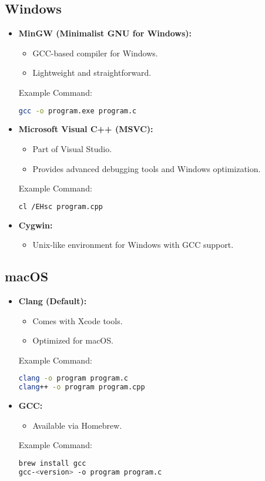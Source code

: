 \documentclass[a4paper,12pt]{article}
\begin{document}
\subsection{Windows}
\begin{itemize}
\item \textbf{MinGW (Minimalist GNU for Windows):}
\begin{itemize}
	\item GCC-based compiler for Windows.
	\item Lightweight and straightforward.
\end{itemize}
Example Command:
\begin{lstlisting}[language=bash]
gcc -o program.exe program.c
\end{lstlisting}

\item \textbf{Microsoft Visual C++ (MSVC):}
\begin{itemize}
	\item Part of Visual Studio.
	\item Provides advanced debugging tools and Windows optimization.
\end{itemize}
Example Command:
\begin{lstlisting}[language=bash]
cl /EHsc program.cpp
\end{lstlisting}

\item \textbf{Cygwin:}
\begin{itemize}
	\item Unix-like environment for Windows with GCC support.
\end{itemize}
\end{itemize}

\subsection{macOS}
\begin{itemize}
\item \textbf{Clang (Default):}
\begin{itemize}
	\item Comes with Xcode tools.
	\item Optimized for macOS.
\end{itemize}
Example Command:
\begin{lstlisting}[language=bash]
clang -o program program.c
clang++ -o program program.cpp
\end{lstlisting}

\item \textbf{GCC:}
\begin{itemize}
	\item Available via Homebrew.
\end{itemize}
Example Command:
\begin{lstlisting}[language=bash]
brew install gcc
gcc-<version> -o program program.c
\end{lstlisting}
\end{itemize}
\end{document}
